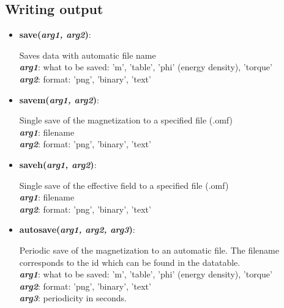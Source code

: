 \subsection{Writing output}

\begin{itemize}

 \item {\textbf{save(\textit{arg1, arg2})}:
				\flushright\parbox{0.9 \textwidth}{\vspace{-0.25cm} 
				Saves data with automatic file name\\
				\textbf{\textit{arg1}}: what to be saved: 'm', 'table', 'phi' (energy density), 'torque'\\
				\textbf{\textit{arg2}}: format: 'png', 'binary', 'text'
				}\flushleft}

 \item {\vspace{-0.4cm}\textbf{savem(\textit{arg1, arg2})}:
				\flushright\parbox{0.9 \textwidth}{\vspace{-0.25cm} 
				Single save of the magnetization to a specified file (.omf)\\
				\textbf{\textit{arg1}}: filename\\
				\textbf{\textit{arg2}}: format: 'png', 'binary', 'text'
				}\flushleft}

 \item {\vspace{-0.4cm}\textbf{saveh(\textit{arg1, arg2})}:
				\flushright\parbox{0.9 \textwidth}{\vspace{-0.25cm} 
				Single save of the effective field to a specified file (.omf)\\
				\textbf{\textit{arg1}}: filename\\
				\textbf{\textit{arg2}}: format: 'png', 'binary', 'text'
				}\flushleft}

 \item {\vspace{-0.4cm}\textbf{autosave(\textit{arg1, arg2, arg3})}:
				\flushright\parbox{0.9 \textwidth}{\vspace{-0.25cm} 
				Periodic save of the magnetization to an automatic file.  The filename corresponds to the id which can be found in the datatable.\\
				\textbf{\textit{arg1}}: what to be saved: 'm', 'table', 'phi' (energy density), 'torque'\\
				\textbf{\textit{arg2}}: format: 'png', 'binary', 'text'\\
				\textbf{\textit{arg3}}: periodicity in seconds.
				}\flushleft}


\end{itemize}
